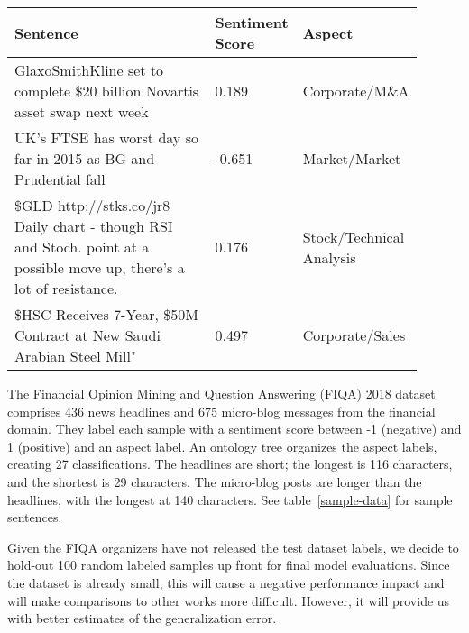 \renewcommand{\arraystretch}{1.5}
\begin{table*}
    \small
    \caption{Sample FIQA 2018 Data}
    \label{sample-data}
    \centering
    \begin{tabular}{p{0.6\linewidth} | p{0.09\linewidth} | p{0.21\linewidth}}
        \toprule
        Sentence     & Sentiment Score     & Aspect \\
        \midrule
        GlaxoSmithKline set to complete \$20 billion Novartis asset swap next week                                                 & 0.189  & Corporate/M\&A            \\
        UK's FTSE has worst day so far in 2015 as BG and Prudential fall                                                          & -0.651 & Market/Market            \\
        \$GLD http://stks.co/jr8 Daily chart - though RSI and Stoch. point at a possible move up, there's a lot of resistance.     & 0.176  & Stock/Technical Analysis \\
        \$HSC Receives 7-Year, \$50M Contract at New Saudi Arabian Steel Mill"                                                      & 0.497  & Corporate/Sales          \\
        \bottomrule
    \end{tabular}
\end{table*}

The Financial Opinion Mining and Question Answering (FIQA) 2018 dataset~\citep{10.1145/3184558.3192301} comprises 436 news headlines and 675 micro-blog messages from the financial domain.
They label each sample with a sentiment score between -1 (negative) and 1 (positive) and an aspect label.
An ontology tree organizes the aspect labels, creating 27 classifications.
The headlines are short;
the longest is 116 characters, and the shortest is 29 characters.
The micro-blog posts are longer than the headlines, with the longest at 140 characters.
See table~\ref{sample-data} for sample sentences.

Given the FIQA organizers have not released the test dataset labels, we decide to hold-out 100 random labeled samples up front for final model evaluations.
Since the dataset is already small, this will cause a negative performance impact and will make comparisons to other works more difficult.
However, it will provide us with better estimates of the generalization error.